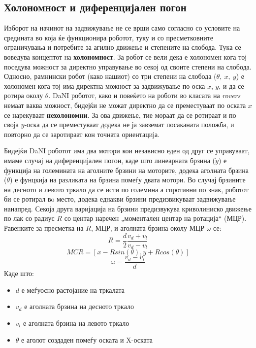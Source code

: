 \documentclass[12pt]{article}
\begin{document}
    \subsection{Холономност и диференцијален погон}
      Изборот на начинот на задвижување не се врши само согласно со условите на средината во која ќе функционира роботот, туку и со пресметковните ограничувања и потребите за агилно движење и степените на слобода. Тука се воведува концептот на \textbf{холономност}. За робот се вели дека е холономен кога тој поседува можност за директно управување во секој од своите степени на слобода. Односно, рамнински робот (како нашиот) со три степени на слобода ($\theta,\ x,\ y$) е холономен кога тој има директна можност за задвижување по оска $x$, $y$, и да се ротира околу $\theta$. DaNI роботот, како и повеќето на роботи во класата на \textit{rovers} немаат ваква можност, бидејќи не можат директно да се преместуваат по оската $x$ се нарекуваат \textbf{нехолономни}. За ова движење, тие мораат да се ротираат и по своја $y$-оска да се преместуваат додека не ја завземат посаканата положба, и повторно да се заротираат кон точната ориентација.

      Бидејќи DaNI роботот има два мотори кои независно еден од друг се управуваат, имаме случај на диференцијален погон, каде што линеарната брзина ($\dot y$) е функција на големината на аголните брзини на моторите, додека аголната брзина ($\dot \theta$) е фунцкија на разликата на брзина помеѓу двата мотори. Во случај брзините на десното и левото тркало да се исти по големина а спротивни по знак, роботот би се ротирал вo место, додека еднакви брзини предизвикуваат задвижување нанапред. Секоја друга варијација на брзини предизвукува криволиниско движење по лак со радиус $R$ со центар наречен „моментален центар на ротација“ (МЦР). Равенките за пресметка на $R$, МЦР, и аголната брзина околу МЦР $\omega$ се:
      $$ R = \frac{d}{2} \frac{v_d + v_l}{v_d - v_l} $$
      $$ MCR = [x - Rsin(\theta), y + Rcos(\theta)] $$
      $$ \omega = \frac{v_d - v_l}{d} $$
      Каде што:
      \begin{itemize}
        \item $d$ е меѓуосно растојание на тркалата
        \item $v_d$ е аголната брзина на десното тркало
        \item $v_l$ е аголната брзина на левото тркало
        \item $\theta$ е аголот создаден помеѓу оската и X-оската
      \end{itemize}
\end{document}
